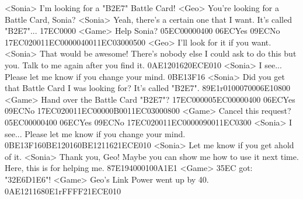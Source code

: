 <Sonia> I'm looking for a "{B2}{E7}" Battle Card! 
<Geo> You're looking for a Battle Card, Sonia? 
<Sonia> Yeah, there's a certain one that I want. 
It's called "{B2}{E7}"... 
{17}{EC}{00}{00} 
<Game> Help Sonia? {05}{EC}{00}{00}{04}{00}  {06}{EC}Yes   {09}{EC}No 
{17}{EC}{02}{00}{11}{EC}{00}{00}{04}{00}{11}{EC}{03}{00}{05}{00}
<Geo> I'll look for it if you want. 
<Sonia> That would be awesome! 
There's nobody else I could ask to do this but you. 
Talk to me again after you find it. 
{0A}{E1}{20}{16}{20}{EC}{E0}{10}
<Sonia> I see... Please let me know if you change your mind. 
{0B}{E1}{3F}{16}
<Sonia> Did you get that Battle Card I was looking for? It's called "{B2}{E7}". 
{89}{E1}r{01}{00}{07}{00}{06}{E1}{08}{00}
<Game> Hand over the Battle Card "{B2}{E7}"? 
{17}{EC}{00}{00}{05}{EC}{00}{00}{04}{00}  {06}{EC}Yes   {09}{EC}No 
{17}{EC}{02}{00}{11}{EC}{00}{00}{0B}{00}{11}{EC}{03}{00}{08}{00}
<Game> Cancel this request? {05}{EC}{00}{00}{04}{00}  {06}{EC}Yes   {09}{EC}No 
{17}{EC}{02}{00}{11}{EC}{00}{00}{09}{00}{11}{EC}{03}{00}
<Sonia> I see... Please let me know if you change your mind. 
{0B}{E1}{3F}{16}{0B}{E1}{20}{16}{0B}{E1}{21}{16}{21}{EC}{E0}{10}
<Sonia> Let me know if you get ahold of it. 
<Sonia> Thank you, Geo! 
Maybe you can show me how to use it next time. 
Here, this is for helping me. 
{87}{E1}{94}{00}{01}{00}{A1}{E1} 
<Game> {35}{EC} got: "{32}{E6}{D1}{E6}"! 
<Game> Geo's Link Power went up by 40. 
{0A}{E1}{21}{16}{80}{E1}r{FF}{FF}{21}{EC}{E0}{10}

